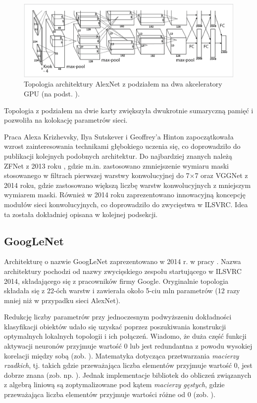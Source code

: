 \begin{figure}[h!]
	\centering
	\includegraphics[width=1\textwidth]{figures/AlexNet-multiGPU.png}
	\caption{Topologia architektury AlexNet z podziałem na dwa akceleratory GPU (na podst. \cite{Krizhevsky2012}).}
	\label{AlexNetTopologyMultiGPU}
\end{figure}

Topologia z podziałem na dwie karty zwiększyła dwukrotnie sumaryczną pamięć i pozwoliła na kolokację parametrów sieci.

Praca Alexa Krizhevsky, Ilya Sutskever i Geoffrey'a Hinton zapoczątkowała wzrost zainteresowania technikami głębokiego uczenia się, co doprowadziło do publikacji kolejnych podobnych architektur. Do najbardziej znanych należą ZFNet z 2013 roku \cite{ZFNet}, gdzie m.in. zastosowano zmniejszenie wymiaru maski stosowanego w filtrach pierwszej warstwy konwolucyjnej do 7$\times$7 oraz VGGNet \cite{VGGNet} z 2014 roku, gdzie zastosowano większą liczbę warstw konwolucyjnych z mniejszym wymiarem maski. Również w 2014 roku zaprezentowano innowacyjną koncepcję modułów sieci konwolucyjnych, co doprowadziło do zwycięstwa w ILSVRC. Idea ta została dokładniej opisana w kolejnej podsekcji.

\subsection{GoogLeNet}
\label{googlenet}
Architekturę o nazwie GoogLeNet zaprezentowano w 2014 r. w pracy \cite{GoogleNet}. Nazwa architektury pochodzi od nazwy zwycięskiego zespołu startującego w ILSVRC 2014, składającego się z pracowników firmy Google. Oryginalnie topologia składała się z 22-óch warstw i zawierała około 5-ciu mln parametrów (12 razy mniej niż \linebreak w przypadku sieci AlexNet). 

Redukcję liczby parametrów przy jednoczesnym podwyższeniu dokładności klasyfikacji obiektów udało się uzyskać poprzez poszukiwania konstrukcji optymalnych lokalnych topologii i ich połączeń. Wiadomo, że duża część funkcji aktywacji neuronów przyjmuje wartość 0 lub jest redundantna z powodu wysokiej korelacji między sobą (zob. \cite{DBLP:journals/corr/AroraBGM13}). Matematyka dotycząca przetwarzania \textit{macierzy rzadkich}, tj. takich gdzie przeważająca liczba elementów przyjmuje wartość 0, jest dobrze znana (zob. np. \cite{Umit2010}). Jednak implementacje bibliotek do obliczeń związanych z algebrą liniową są zoptymalizowane pod kątem \textit{macierzy gęstych}, gdzie przeważająca liczba elementów przyjmuje wartości różne od 0 (zob. \cite{Song:2014:SUM:2597652.2597670, Krizhevsky2012}). 


